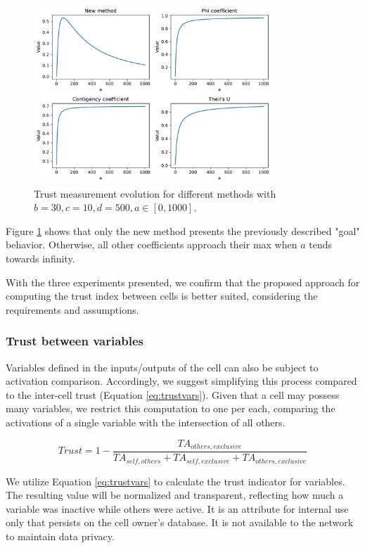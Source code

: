 \begin{figure}[h!]
\centering
    \includegraphics[width=0.8\textwidth]{figures/chapter4/cell/trust_tests/3.pdf}
    \caption{Trust measurement evolution for different methods with $b=30, c=10, d=500, a \in [0, 1000]$.}
    \label{fig:trust_test_3}
\end{figure}
\FloatBarrier

Figure \ref{fig:trust_test_3} shows that only the new method presents the previously described "goal" behavior. Otherwise, all other coefficients approach their max when $a$ tends towards infinity.

With the three experiments presented, we confirm that the proposed approach for computing the trust index between cells is better suited, considering the requirements and assumptions.

\subsubsection{Trust between variables}

Variables defined in the inputs/outputs of the cell can also be subject to activation comparison. Accordingly, we suggest simplifying this process compared to the inter-cell trust (Equation \ref{eq:trustvars}). Given that a cell may possess many variables, we restrict this computation to one per each, comparing the activations of a single variable with the intersection of all others.

\begin{equation} \label{eq:trustvars}
    Trust = 1 - \frac{TA_{others, exclusive}}{TA_{self,others} + TA_{self, exclusive} + TA_{others, exclusive}}
\end{equation}

We utilize Equation \ref{eq:trustvars} to calculate the trust indicator for variables. The resulting value will be normalized and transparent, reflecting how much a variable was inactive while others were active. It is an attribute for internal use only that persists on the cell owner's database. It is not available to the network to maintain data privacy.

